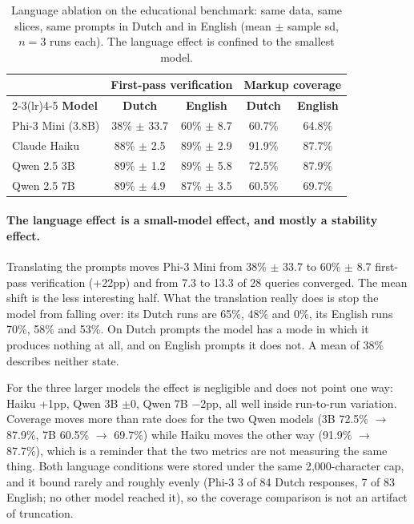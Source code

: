 \documentclass[11pt,a4paper]{article}
\begin{document}
\begin{table}[h]
\centering
\small
\begin{tabular}{lcccc}
\toprule
& \multicolumn{2}{c}{\textbf{First-pass verification}} & \multicolumn{2}{c}{\textbf{Markup coverage}} \\
\cmidrule(lr){2-3}\cmidrule(lr){4-5}
\textbf{Model} & \textbf{Dutch} & \textbf{English} & \textbf{Dutch} & \textbf{English} \\
\midrule
Phi-3 Mini (3.8B) & 38\% $\pm$ 33.7 & 60\% $\pm$ 8.7 & 60.7\% & 64.8\% \\
Claude Haiku & 88\% $\pm$ 2.5 & 89\% $\pm$ 2.9 & 91.9\% & 87.7\% \\
Qwen 2.5 3B & 89\% $\pm$ 1.2 & 89\% $\pm$ 5.8 & 72.5\% & 87.9\% \\
Qwen 2.5 7B & 89\% $\pm$ 4.9 & 87\% $\pm$ 3.5 & 60.5\% & 69.7\% \\
\bottomrule
\end{tabular}
\caption{Language ablation on the educational benchmark: same data, same slices, same prompts in Dutch and in English (mean $\pm$ sample sd, $n{=}3$ runs each). The language effect is confined to the smallest model.}
\label{tab:langablation}
\end{table}

\paragraph{The language effect is a small-model effect, and mostly a stability effect.} Translating the prompts moves Phi-3 Mini from 38\% $\pm$ 33.7 to 60\% $\pm$ 8.7 first-pass verification (+22pp) and from 7.3 to 13.3 of 28 queries converged. The mean shift is the less interesting half. What the translation really does is stop the model from falling over: its Dutch runs are 65\%, 48\% and 0\%, its English runs 70\%, 58\% and 53\%. On Dutch prompts the model has a mode in which it produces nothing at all, and on English prompts it does not. A mean of 38\% describes neither state.

For the three larger models the effect is negligible and does not point one way: Haiku +1pp, Qwen 3B $\pm$0, Qwen 7B $-$2pp, all well inside run-to-run variation. Coverage moves more than rate does for the two Qwen models (3B 72.5\% $\rightarrow$ 87.9\%, 7B 60.5\% $\rightarrow$ 69.7\%) while Haiku moves the other way (91.9\% $\rightarrow$ 87.7\%), which is a reminder that the two metrics are not measuring the same thing. Both language conditions were stored under the same 2{,}000-character cap, and it bound rarely and roughly evenly (Phi-3 3 of 84 Dutch responses, 7 of 83 English; no other model reached it), so the coverage comparison is not an artifact of truncation.
\end{document}
